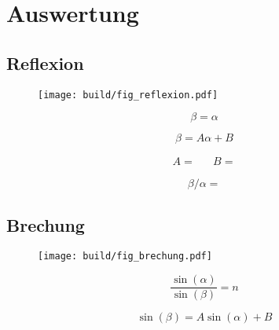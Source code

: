 \section{Auswertung}
\label{sec:auswertung}


\subsection{Reflexion}

\begin{figure}[H]
	\texttt{[image: build/fig\_reflexion.pdf]}
	\caption{}
	\label{fig:reflexion}
\end{figure}

\begin{equation*}
	\beta = \alpha
\end{equation*}

\begin{equation*}
	\beta = A \alpha + B
\end{equation*}

\begin{align*}
	A =  && B = 
\end{align*}

\begin{table}[H]
	\centering
	\caption{}
	
	\label{tab:reflexion}
\end{table}

\begin{equation*}
	\beta / \alpha = 
\end{equation*}


\subsection{Brechung}

\begin{figure}[H]
	\texttt{[image: build/fig\_brechung.pdf]}
	\caption{}
	\label{fig:brechung}
\end{figure}

\begin{equation*}
	\frac{\sin(\alpha)}{\sin(\beta)} = n
\end{equation*}

\begin{equation*}
	\sin(\beta) = A \sin(\alpha) + B
\end{equation*}


